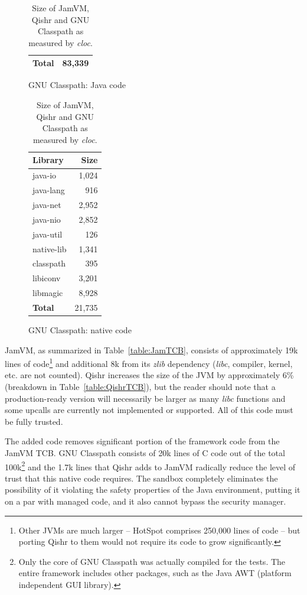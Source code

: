 \documentclass[a4paper,12pt,twoside,openright]{report}
\newcommand{\tool}[1]{\emph{#1}}
\newcommand{\lib}[1]{\tool{lib#1}}
\begin{document}
\begin{table}[t]
\begin{subfigure}{0.45\textwidth}
\begin{tabular}{|l|r|}
		\hline
		\bf Total		& 83,339		\\
		\hline
		\end{tabular}
		\caption{GNU Classpath: Java code}
	\end{subfigure}
	\begin{subfigure}{0.45\textwidth}
		\centering
		\footnotesize
		\begin{tabular}{|l|r|}
		\hline
		\bf Library		& \bf Size		\\
		\hline
		java-io		& 1,024				\\
		java-lang		& 916				\\
		java-net		& 2,952				\\
		java-nio		& 2,852				\\
		java-util		& 126				\\
		native-lib		& 1,341				\\
		classpath		& 395				\\
		libiconv		& 3,201				\\
		libmagic		& 8,928				\\
		\hline
		\bf Total		& 21,735				\\
		\hline
		\end{tabular}
		\caption{GNU Classpath: native code}
	\end{subfigure}
	\caption{Size of JamVM, Qishr and GNU Classpath as measured by \emph{cloc}.}
\end{table}

JamVM, as summarized in Table~\ref{table:JamTCB}, consists of approximately 19k lines of code\footnote{Other JVMs are much larger -- HotSpot comprises 250,000 lines of code -- but porting Qishr to them would not require its code to grow significantly.} and additional 8k from its \emph{zlib} dependency (\lib{c}, compiler, kernel, etc. are not counted). Qishr increases the size of the JVM by approximately 6\% (breakdown in Table~\ref{table:QishrTCB}), but the reader should note that a production-ready version will necessarily be larger as many \lib{c} functions and some upcalls are currently not implemented or supported. All of this code must be fully trusted.

The added code removes significant portion of the framework code from the JamVM TCB. GNU Classpath consists of 20k lines of C code out of the total 100k\footnote{Only the core of GNU Classpath was actually compiled for the tests. The entire framework includes other packages, such as the Java AWT (platform independent GUI library).} and the 1.7k lines that Qishr adds to JamVM radically reduce the level of trust that this native code requires. The sandbox completely eliminates the possibility of it violating the safety properties of the Java environment, putting it on a par with managed code, and it also cannot bypass the security manager.
\end{document}
